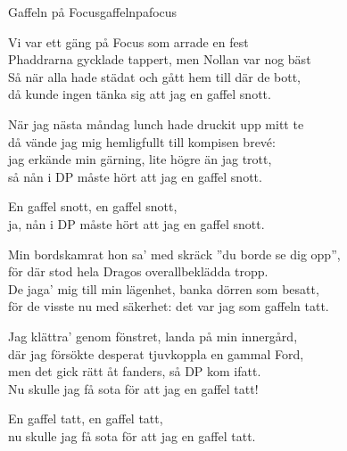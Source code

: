 \begin{song}{Gaffeln på Focus}{gaffelnpafocus}

\begin{vers}
Vi var ett gäng på Focus som arrade en fest \\
Phaddrarna gycklade tappert, men Nollan var nog bäst \\
Så när alla hade städat och gått hem till där de bott, \\
då kunde ingen tänka sig att jag en gaffel snott.\\
\end{vers}

\begin{vers}
När jag nästa måndag lunch hade druckit upp mitt te\\
då vände jag mig hemligfullt till kompisen brevé:\\
jag erkände min gärning, lite högre än jag trott,\\
så nån i DP måste hört att jag en gaffel snott.\\
\end{vers}

\begin{vers}
En gaffel snott, en gaffel snott,\\
ja, nån i DP måste hört att jag en gaffel snott.\\
\end{vers}

\begin{vers}
Min bordskamrat hon sa' med skräck ''du borde se dig opp'',\\
för där stod hela Dragos overallbeklädda tropp.\\
De jaga' mig till min lägenhet, banka dörren som besatt,\\
för de visste nu med säkerhet: det var jag som gaffeln tatt.\\
\end{vers}

\begin{vers}
Jag klättra' genom fönstret, landa på min innergård,\\
där jag försökte desperat tjuvkoppla en gammal Ford,\\
men det gick rätt åt fanders, så DP kom ifatt.\\
Nu skulle jag få sota för att jag en gaffel tatt!\\
\end{vers}

\begin{vers}
En gaffel tatt, en gaffel tatt,\\
nu skulle jag få sota för att jag en gaffel tatt.\\
\end{vers}


\end{song}
